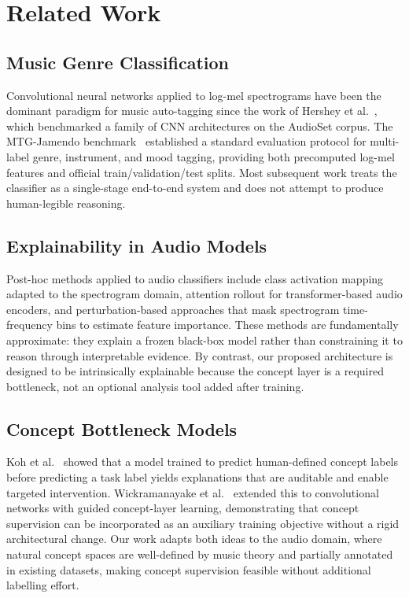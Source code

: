 \documentclass[sigconf,nonacm]{acmart}
\begin{document}
\section{Related Work}

\subsection{Music Genre Classification}

Convolutional neural networks applied to log-mel spectrograms have been the dominant paradigm
for music auto-tagging since the work of Hershey et al.~\cite{hershey2017cnn}, which
benchmarked a family of CNN architectures on the AudioSet corpus. The MTG-Jamendo
benchmark~\cite{bogdanov2019mtg} established a standard evaluation protocol for multi-label
genre, instrument, and mood tagging, providing both precomputed log-mel features and official
train/validation/test splits. Most subsequent work treats the classifier as a single-stage
end-to-end system and does not attempt to produce human-legible reasoning.

\subsection{Explainability in Audio Models}

Post-hoc methods applied to audio classifiers include class activation mapping adapted to the
spectrogram domain, attention rollout for transformer-based audio encoders, and
perturbation-based approaches that mask spectrogram time-frequency bins to estimate feature
importance. These methods are fundamentally approximate: they explain a frozen black-box model
rather than constraining it to reason through interpretable evidence. By contrast, our proposed
architecture is designed to be intrinsically explainable because the concept layer is a required
bottleneck, not an optional analysis tool added after training.

\subsection{Concept Bottleneck Models}

Koh et al.~\cite{koh2020concept} showed that a model trained to predict human-defined concept
labels before predicting a task label yields explanations that are auditable and enable targeted
intervention. Wickramanayake et al.~\cite{wickramanayake2021comprehensible} extended this to
convolutional networks with guided concept-layer learning, demonstrating that concept supervision
can be incorporated as an auxiliary training objective without a rigid architectural change.
Our work adapts both ideas to the audio domain, where natural concept spaces are well-defined
by music theory and partially annotated in existing datasets, making concept supervision
feasible without additional labelling effort.
\end{document}
